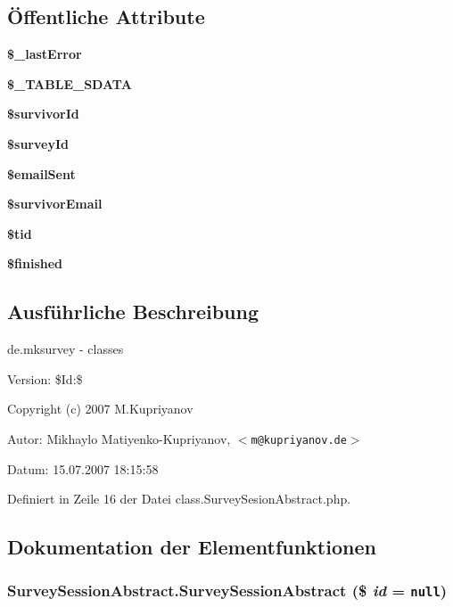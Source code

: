 \subsection*{Öffentliche Attribute}
\begin{CompactItemize}
\item 
{\bf \$\_\-lastError}
\item 
{\bf \$\_\-TABLE\_\-SDATA}
\item 
{\bf \$survivorId}
\item 
{\bf \$surveyId}
\item 
{\bf \$emailSent}
\item 
{\bf \$survivorEmail}
\item 
{\bf \$tid}
\item 
{\bf \$finished}
\end{CompactItemize}


\subsection{Ausführliche Beschreibung}
de.mksurvey - classes \begin{Desc}
\item[Version:]\$Id:\$\end{Desc}
Copyright (c) 2007 M.Kupriyanov \begin{Desc}
\item[Autor:]Mikhaylo Matiyenko-Kupriyanov, $<${\tt m@kupriyanov.de}$>$ \end{Desc}
\begin{Desc}
\item[Datum:]15.07.2007 18:15:58 \end{Desc}


Definiert in Zeile 16 der Datei class.SurveySesionAbstract.php.

\subsection{Dokumentation der Elementfunktionen}
\subsubsection{\setlength{\rightskip}{0pt plus 5cm}SurveySessionAbstract.SurveySessionAbstract (\$ {\em id} = {\tt null})}\label{classSurveySessionAbstract_7c5482c5e26ebdc8dc53eb0fbd28b70c}




